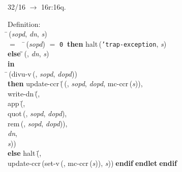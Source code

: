  32/16 $\rightarrow$ 16r:16q.
\begin{tabbing}{\sc Definition}: \\  
\=\,({\it{sopd\/}}, {\it{dn\/}}, {\it{s\/}}) \\ 
$=$$\;\;\;\;$\=\,({\it{sopd\/}}) $=$ {\tt{0}}$\;\;${\bf then }{\rm{halt}}\,({\tt{'}}{\tt{trap-exception}}, {\it{s\/}}) \\ 
{\bf else }\=\=\,({}, {\it{dn\/}}, {\it{s\/}})\- \\ 
{\bf in} \\ 
\=\,({\rm{divu-v}}\,({}, {\it{sopd\/}}, {\it{dopd\/}})) \\ 
{\bf then }{\rm{update-ccr}}\,(\=\,({}, {\it{sopd\/}}, {\it{dopd\/}}, {\rm{mc-ccr}}\,({\it{s\/}})), \\ 
{\rm{write-dn}}\,(\=, \\ 
{\rm{app}}\,(\=, \\ 
{\rm{quot}}\,({}, {\it{sopd\/}}, {\it{dopd\/}}), \\ 
{\rm{rem}}\,({}, {\it{sopd\/}}, {\it{dopd\/}}))\-, \\ 
{\it{dn\/}}, \\ 
{\it{s\/}})\-)\- \\ 
{\bf else }{\rm{halt}}\,(\=, \\ 
{\rm{update-ccr}}\,({\rm{set-v}}\,({}, {\rm{mc-ccr}}\,({\it{s\/}})), {\it{s\/}}))\-$\;${\bf  endif}\-$\;${\bf  endlet}\-$\;${\bf  endif}\-\-
\end{tabbing}

